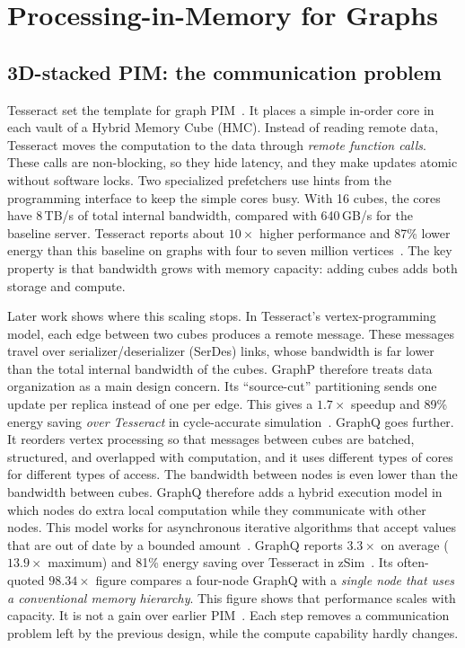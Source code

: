 \documentclass[journal,onecolumn]{IEEEtran}
\begin{document}
\section{Processing-in-Memory for Graphs}\label{sec:pim}
\subsection{3D-stacked PIM: the communication problem}
Tesseract set the template for graph PIM~\cite{ahn2015tesseract}. It places a simple in-order core in each vault of a Hybrid Memory Cube (HMC). Instead of reading remote data, Tesseract moves the computation to the data through \emph{remote function calls}. These calls are non-blocking, so they hide latency, and they make updates atomic without software locks. Two specialized prefetchers use hints from the programming interface to keep the simple cores busy. With 16 cubes, the cores have 8\,TB/s of total internal bandwidth, compared with 640\,GB/s for the baseline server. Tesseract reports about $10\times$ higher performance and 87\% lower energy than this baseline on graphs with four to seven million vertices~\cite{ahn2015tesseract}. The key property is that bandwidth grows with memory capacity: adding cubes adds both storage and compute.

Later work shows where this scaling stops. In Tesseract's vertex-programming model, each edge between two cubes produces a remote message. These messages travel over serializer/deserializer (SerDes) links, whose bandwidth is far lower than the total internal bandwidth of the cubes. GraphP therefore treats data organization as a main design concern. Its ``source-cut'' partitioning sends one update per replica instead of one per edge. This gives a $1.7\times$ speedup and 89\% energy saving \emph{over Tesseract} in cycle-accurate simulation~\cite{zhang2018graphp}. GraphQ goes further. It reorders vertex processing so that messages between cubes are batched, structured, and overlapped with computation, and it uses different types of cores for different types of access. The bandwidth between nodes is even lower than the bandwidth between cubes. GraphQ therefore adds a hybrid execution model in which nodes do extra local computation while they communicate with other nodes. This model works for asynchronous iterative algorithms that accept values that are out of date by a bounded amount~\cite{zhuo2019graphq}. GraphQ reports $3.3\times$ on average ($13.9\times$ maximum) and 81\% energy saving over Tesseract in zSim~\cite{zhuo2019graphq}. Its often-quoted $98.34\times$ figure compares a four-node GraphQ with a \emph{single node that uses a conventional memory hierarchy}. This figure shows that performance scales with capacity. It is not a gain over earlier PIM~\cite{zhuo2019graphq}. Each step removes a communication problem left by the previous design, while the compute capability hardly changes.
\end{document}
